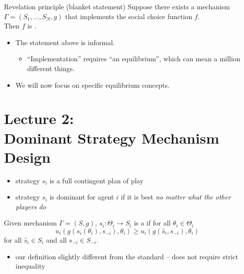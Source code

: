 \documentclass[english,handout]{beamer}		%
\def\lyxframeend{} %
\begin{document}
\begin{block}{Revelation principle (blanket statement)}
	Suppose there exists a mechanism $\Gamma=(S_{1},\dots,S_{N},g)$ that implements the social choice function $f$.\\ Then $f$ is .
\end{block}
\pause\medskip
\begin{itemize}
	\item The statement above is informal.
	\begin{itemize}
		\item ``Implementation'' requires ``an equilibrium'', which can mean a million different things.
	\end{itemize}
	\item We will now focus on specific equilibrium concepts.
\end{itemize}
\lyxframeend





\section{Lecture 2: \\ Dominant Strategy Mechanism Design}

\begin{itemize}
	\item strategy $s_i$ is a full contingent plan of play
	\item strategy $s_i$ is dominant for agent $i$ if it is best \emph{no matter what the other players do}
\end{itemize}
\begin{definition}
	Given mechanism $\Gamma=(S,g)$,
	$s_{i}: \Theta_{i}\rightarrow S_{i}$ is a  if for all $\theta_{i}\in \Theta_{i}$
	$$ u_{i}(g(s_{i}(\theta_{i}),s_{-i}),\theta_{i})\geq u_{i}(g(\hat s_{i},s_{-i}),\theta_{i})$$
	for all $\hat s_{i}\in S_{i}$  and all $s_{-i}\in S_{-i}$.
\end{definition}
\pause
\begin{itemize}
	\item our definition slightly different from the standard -- does not require strict inequality
\end{itemize}
\lyxframeend
\end{document}
